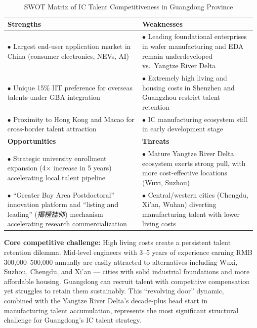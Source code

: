 \documentclass[12pt,a4paper]{article}
\newcommand{\tableHeaderRow}{\rowcolor{tealPrimary}\color{white}}
\newcommand{\tableOddRow}{\rowcolor{mintBG}}
\begin{document}
\begin{table}[H]
\centering
\caption{SWOT Matrix of IC Talent Competitiveness in Guangdong Province}
\label{tab:talent_swot}
\begin{tabular}{p{7cm}p{7cm}}
\toprule
\tableHeaderRow
\textbf{Strengths} & \textbf{Weaknesses} \\
\midrule
\tableOddRow
$\bullet$ Largest end-user application market in China (consumer electronics, NEVs, AI) &
$\bullet$ Leading foundational enterprises in wafer manufacturing and EDA remain underdeveloped vs.\ Yangtze River Delta \\
$\bullet$ Unique 15\% IIT preference for overseas talents under GBA integration &
$\bullet$ Extremely high living and housing costs in Shenzhen and Guangzhou restrict talent retention \\
$\bullet$ Proximity to Hong Kong and Macao for cross-border talent attraction &
$\bullet$ IC manufacturing ecosystem still in early development stage \\
\midrule
\tableHeaderRow
\textbf{Opportunities} & \textbf{Threats} \\
\midrule
\tableOddRow
$\bullet$ Strategic university enrollment expansion (4$\times$ increase in 5 years) accelerating local talent pipeline &
$\bullet$ Mature Yangtze River Delta ecosystem exerts strong pull, with more cost-effective locations (Wuxi, Suzhou) \\
$\bullet$ ``Greater Bay Area Postdoctoral'' innovation platform and ``listing and leading'' (\textit{揭榜挂帅}) mechanism accelerating research commercialization &
$\bullet$ Central/western cities (Chengdu, Xi'an, Wuhan) diverting manufacturing talent with lower living costs \\
\bottomrule
\end{tabular}
\end{table}

\textbf{Core competitive challenge:} High living costs create a persistent
talent retention dilemma. Mid-level engineers with 3--5 years of experience
earning RMB 300,000--500,000 annually are easily attracted to alternatives
including Wuxi, Suzhou, Chengdu, and Xi'an — cities with solid industrial
foundations and more affordable housing. Guangdong can recruit talent with
competitive compensation yet struggles to retain them sustainably. This
``revolving door'' dynamic, combined with the Yangtze River Delta's decade-plus
head start in manufacturing talent accumulation, represents the most
significant structural challenge for Guangdong's IC talent strategy.
\end{document}
